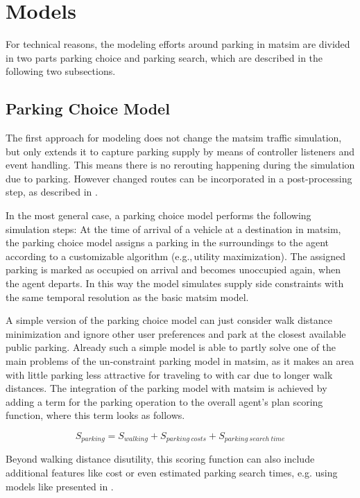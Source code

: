 \section{Models}
For technical reasons, the modeling efforts around parking in \gls{matsim} are divided in two parts parking choice and parking search, which are described in the following two subsections. 

\subsection{Parking Choice Model}
The first approach for modeling does not change the \gls{matsim} traffic simulation, but only extends it to capture parking supply by means of controller listeners and event handling. This means there is no rerouting happening during the simulation due to parking. However changed routes can be incorporated in a post-processing step, as described in \citet[][]{WaraichAxhausen_TRR_2012}. 

In the most general case, a parking choice model performs the following simulation steps: At the time of arrival of a vehicle at a destination in \gls{matsim}, the parking choice model assigns a parking in the surroundings to the agent according to a customizable algorithm (e.g.,\,utility maximization). The assigned parking is marked as occupied on arrival and becomes unoccupied again, when the agent departs. In this way the model simulates supply side constraints with the same temporal resolution as the basic \gls{matsim} model.

A simple version of the parking choice model can just consider walk distance minimization and ignore other user preferences and park at the closest available public parking. Already such a simple model is able to partly solve one of the main problems of the un-constraint parking model in \gls{matsim}, as it makes an area with little parking less attractive for traveling to with car due to longer walk distances. The integration of the parking model with \gls{matsim} is achieved by adding a term for the parking operation to the overall agent’s plan scoring function, where this term looks as follows.

\begin{equation}
\label{eq:parkingutf}
S_{parking} = S_{walking} + S_{parking\ costs} + S_{parking\ search\ time}
\end{equation}

Beyond walking distance disutility, this scoring function can also include additional features like cost or even estimated parking search times, e.g. using models like presented in \citet[][]{HorniEtAl_IATBRspec_2013}.

